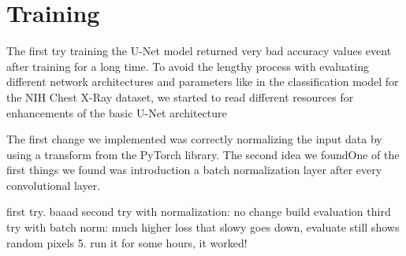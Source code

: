 \section{Training}

The first try training the U-Net model returned very bad accuracy values event after training for a long time. To avoid the lengthy process with evaluating different network architectures and parameters like in the classification model for the NIH Chest X-Ray dataset, we started to read different resources for enhancements of the basic U-Net architecture

The first change we implemented was correctly normalizing the input data by using a transform from the PyTorch library.
The second idea we foundOne of the first things we found was introduction a batch normalization layer after every convolutional layer.



first try. baaad
second try with normalization: no change
build evaluation
third try with batch norm: much higher loss that slowy goes down, evaluate still shows random pixels
5. run it for some hours, it worked!


